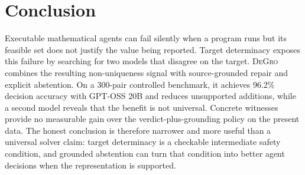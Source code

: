 \documentclass[sigconf,anonymous]{aamas}
\newcommand{\method}{\textsc{DeGro}}
\begin{document}
\section{Conclusion}
Executable mathematical agents can fail silently when a program runs but its feasible set does not justify the value being reported.  Target determinacy exposes this failure by searching for two models that disagree on the target.  \method{} combines the resulting non-uniqueness signal with source-grounded repair and explicit abstention.  On a 300-pair controlled benchmark, it achieves 96.2\% decision accuracy with GPT-OSS 20B and reduces unsupported additions, while a second model reveals that the benefit is not universal.  Concrete witnesses provide no measurable gain over the verdict-plus-grounding policy on the present data.  The honest conclusion is therefore narrower and more useful than a universal solver claim: target determinacy is a checkable intermediate safety condition, and grounded abstention can turn that condition into better agent decisions when the representation is supported.

\clearpage
\balance


\end{document}
